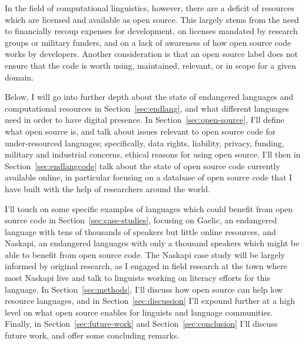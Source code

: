 In the field of computational linguistics, however, there are a deficit of resources which are licensed and available as open source. This largely stems from the need to financially recoup expenses for development, on licenses mandated by research groups or military funders, and on a lack of awareness of how open source code works by developers. Another consideration is that an open source label does not ensure that the code is worth using, maintained, relevant, or in scope for a given domain.

Below, I will go into further depth about the state of endangered languages and computational resources in Section~\ref{sec:endlang}, and what different languages need in order to have digital presence. In Section~\ref{sec:open-source}, I'll define what open source is, and talk about issues relevant to open source code for under-resourced languages; specifically, data rights, liability, privacy, funding, military and industrial concerns, ethical reasons for using open source. I'll then in Section~\ref{sec:endlangcode} talk about the state of open source code currently available online, in particular focusing on a database of open source code that I have built with the help of researchers around the world.

I'll touch on some specific examples of languages which could benefit from open source code in Section~\ref{sec:case-studies}, focusing on Gaelic, an endangered language with tens of thousands of speakers but little online resources, and Naskapi, an endangered languages with only a thousand speakers which might be able to benefit from open source code. The Naskapi case study will be largely informed by original research, as I engaged in field research at the town where most Naskapi live and talk to linguists working on literacy efforts for this language. In Section~\ref{sec:methods}, I'll discuss how open source can help low resource languages, and in Section~\ref{sec:discussion} I'll expound further at a high level on what open source enables for linguists and language communities. Finally, in Section~\ref{sec:future-work} and Section~\ref{sec:conclusion} I'll discuss future work, and offer some concluding remarks.
